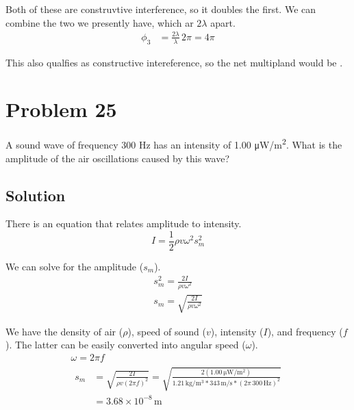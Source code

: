 \documentclass[12pt]{article}
\newcommand{\E}[1]{\times 10^{#1}}
\begin{document}
            Both of these are construvtive interference, so it doubles the first.
            We can combine the two we presently have, which ar $2\lambda$ apart.
            \begin{align}
                \phi_3  &=  \frac{2\lambda}{\lambda}\,2\pi
                    =   4\pi
            \end{align}

            This also qualfies as constructive intereference, so the net multipland would be .

    \pagebreak
    \section{Problem 25}
        A sound wave of frequency 300 Hz has an intensity of 1.00 \unit{\micro\watt/\meter^2}. 
        What is the amplitude of the air oscillations caused by this wave?

        \subsection{Solution}
            There is an equation that relates amplitude to intensity.
            \begin{equation}
                I   =   \frac{1}{2}\rho v \omega^2 s_m^2
            \end{equation}

            We can solve for the amplitude ($s_m$).
            \begin{gather}
                s_m^2   =   \frac{2I}{\rho v \omega^2}\\
                s_m =   \sqrt{\frac{2I}{\rho v \omega^2}}
            \end{gather}

            We have the density of air ($\rho$), speed of sound ($v$), intensity ($I$), and frequency ($f$).
            The latter can be easily converted into angular speed ($\omega$).
            \begin{gather}
                \omega  =   2\pi f\\
                \begin{align}
                    s_m &=  \sqrt{\frac{2I}{\rho v (2\pi f)^2}}
                        =   \sqrt{\frac{2(1.00\,\unit{\micro\watt/\meter^2})}{1.21\,\unit{\kilo\gram/\meter^3} * 343\,\unit{\meter/\second} * (2\pi\,300\,\unit{\hertz})^2}}\\
                        &=  \boxed{3.68\E{-8}\,\unit{\meter}}
                \end{align}
            \end{gather}
\end{document}
